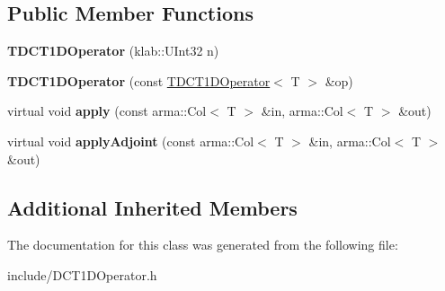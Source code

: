 \subsection*{Public Member Functions}
\begin{DoxyCompactItemize}
\item 
{\bfseries T\+D\+C\+T1\+D\+Operator} (klab\+::\+U\+Int32 n)\hypertarget{classkl1p_1_1TDCT1DOperator_ac830e532c352e2e3ea24edc5ab34319d}{}\label{classkl1p_1_1TDCT1DOperator_ac830e532c352e2e3ea24edc5ab34319d}

\item 
{\bfseries T\+D\+C\+T1\+D\+Operator} (const \hyperlink{classkl1p_1_1TDCT1DOperator}{T\+D\+C\+T1\+D\+Operator}$<$ T $>$ \&op)\hypertarget{classkl1p_1_1TDCT1DOperator_a0418ee1de32bb7c2160988550cea6dd6}{}\label{classkl1p_1_1TDCT1DOperator_a0418ee1de32bb7c2160988550cea6dd6}

\item 
virtual void {\bfseries apply} (const arma\+::\+Col$<$ T $>$ \&in, arma\+::\+Col$<$ T $>$ \&out)\hypertarget{classkl1p_1_1TDCT1DOperator_af64738f97bed610847054820e18d7900}{}\label{classkl1p_1_1TDCT1DOperator_af64738f97bed610847054820e18d7900}

\item 
virtual void {\bfseries apply\+Adjoint} (const arma\+::\+Col$<$ T $>$ \&in, arma\+::\+Col$<$ T $>$ \&out)\hypertarget{classkl1p_1_1TDCT1DOperator_ab5ca501b22a7416983c23b501b3e377f}{}\label{classkl1p_1_1TDCT1DOperator_ab5ca501b22a7416983c23b501b3e377f}

\end{DoxyCompactItemize}
\subsection*{Additional Inherited Members}


The documentation for this class was generated from the following file\+:\begin{DoxyCompactItemize}
\item 
include/D\+C\+T1\+D\+Operator.\+h\end{DoxyCompactItemize}

